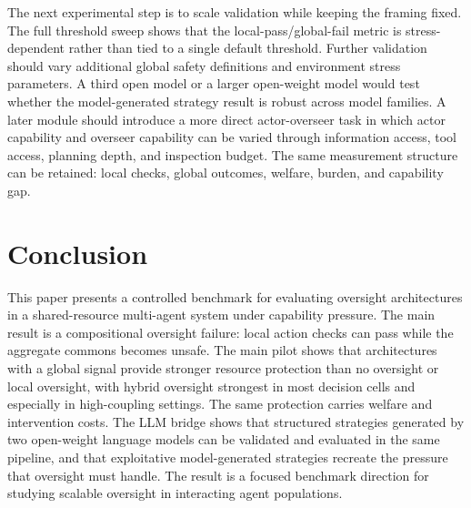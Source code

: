 \documentclass[11pt]{article}
\begin{document}
The next experimental step is to scale validation while keeping the framing fixed. The full threshold sweep shows that the local-pass/global-fail metric is stress-dependent rather than tied to a single default threshold. Further validation should vary additional global safety definitions and environment stress parameters. A third open model or a larger open-weight model would test whether the model-generated strategy result is robust across model families. A later module should introduce a more direct actor-overseer task in which actor capability and overseer capability can be varied through information access, tool access, planning depth, and inspection budget. The same measurement structure can be retained: local checks, global outcomes, welfare, burden, and capability gap.

\section{Conclusion}

This paper presents a controlled benchmark for evaluating oversight architectures in a shared-resource multi-agent system under capability pressure. The main result is a compositional oversight failure: local action checks can pass while the aggregate commons becomes unsafe. The main pilot shows that architectures with a global signal provide stronger resource protection than no oversight or local oversight, with hybrid oversight strongest in most decision cells and especially in high-coupling settings. The same protection carries welfare and intervention costs. The LLM bridge shows that structured strategies generated by two open-weight language models can be validated and evaluated in the same pipeline, and that exploitative model-generated strategies recreate the pressure that oversight must handle. The result is a focused benchmark direction for studying scalable oversight in interacting agent populations.



\end{document}
